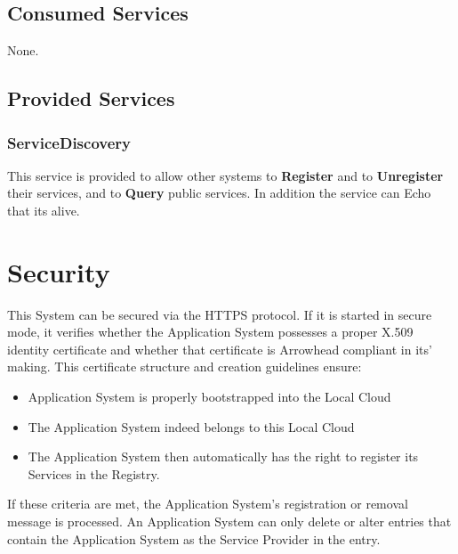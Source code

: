 \documentclass[a4paper]{arrowhead}
\newcommand{\spdef}[2]{{\textcolor{ArrowheadBlue}{#2\label{sec:services:produced:#1}}}}
\begin{document}
\subsection{Consumed Services}

None.

\subsection{Provided Services}

\subsubsection{\spdef{ServiceDiscovery}{ServiceDiscovery}}

This service is provided to allow other systems to \textbf{Register}
and to \textbf{Unregister} their services, and to \textbf{Query}
public services. In addition the service can Echo that its alive.

\section{Security}
\label{sec:security}

This System can be secured via the HTTPS protocol. If it is started in secure mode, it verifies whether the Application System possesses a proper X.509 identity certificate and whether that certificate is Arrowhead compliant in its' making. This certificate structure and creation guidelines ensure:

\begin{itemize}
    \item Application System is properly bootstrapped into the Local Cloud
    \item The Application System indeed belongs to this Local Cloud
    \item The Application System then automatically has the right to register its Services in the Registry.
   
\end{itemize}

 If these criteria are met, the Application System’s registration or removal message is processed. An Application System can only delete or alter entries that contain the Application System as the Service Provider in the entry.



\newpage



\end{document}
